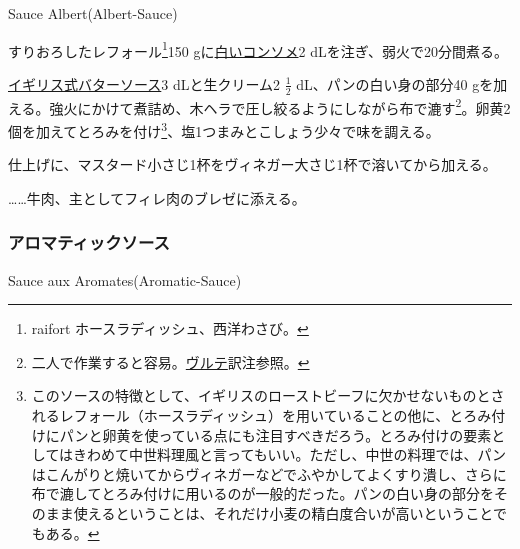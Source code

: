 \begin{recette}
\begin{frsubenv}

Sauce Albert\hspace{1em}\normalfont(Albert-Sauce)

\end{frsubenv}


すりおろしたレフォール\footnote{raifort ホースラディッシュ、西洋わさび。}150
gに\protect\hyperlink{}{白いコンソメ}2 dLを注ぎ、弱火で20分間煮る。

\protect\hyperlink{butter-sauce}{イギリス式バターソース}3
dLと生クリーム2 \(\frac{1}{2}\) dL、パンの白い身の部分40
gを加える。強火にかけて煮詰め、木ヘラで圧し絞るようにしながら布で漉す\footnote{二人で作業すると容易。\protect\hyperlink{veloute}{ヴルテ}訳注参照。}。卵黄2個を加えてとろみを付け\footnote{このソースの特徴として、イギリスのローストビーフに欠かせないものとされるレフォール（ホースラディッシュ）を用いていることの他に、とろみ付けにパンと卵黄を使っている点にも注目すべきだろう。とろみ付けの要素としてはきわめて中世料理風と言ってもいい。ただし、中世の料理では、パンはこんがりと焼いてからヴィネガーなどでふやかしてよくすり潰し、さらに布で漉してとろみ付けに用いるのが一般的だった。パンの白い身の部分をそのまま使えるということは、それだけ小麦の精白度合いが高いということでもある。}、塩1つまみとこしょう少々で味を調える。

仕上げに、マスタード小さじ1杯をヴィネガー大さじ1杯で溶いてから加える。

\ldots{}\ldots{}牛肉、主としてフィレ肉のブレゼに添える。

\atoaki{}

\hypertarget{aromatic-sauce}{%
\subsubsection{アロマティックソース}\label{aromatic-sauce}}

\begin{frsubenv}

Sauce aux Aromates\hspace{1em}\normalfont(Aromatic-Sauce)


\end{frsubenv}
\end{recette}
